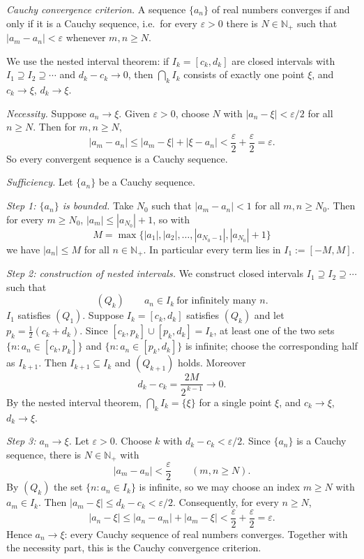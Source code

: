 \documentclass[11pt,a4paper]{article}
\newenvironment{solution}[1]{%
  \par\addvspace{1.7ex}%
  \noindent{\color{solutioncolor}\textbf{#1}}\hspace{0.55em}\ignorespaces}%
  {\par\addvspace{0.9ex}}
\begin{document}
\begin{solution}{Solution 2.3.19}\label{xs:2.3.19}
\emph{Cauchy convergence criterion.} A sequence $\{a_n\}$ of real numbers converges if and only if it is a Cauchy sequence, i.e.\ for every $\varepsilon > 0$ there is $N \in \mathbb{N}_+$ such that $|a_m - a_n| < \varepsilon$ whenever $m, n \ge N$.

We use the nested interval theorem: if $I_k = [c_k,d_k]$ are closed intervals with $I_1 \supseteq I_2 \supseteq \cdots$ and $d_k - c_k \to 0$, then $\bigcap_k I_k$ consists of exactly one point $\xi$, and $c_k \to \xi$, $d_k \to \xi$.

\medskip
\noindent\emph{Necessity.} Suppose $a_n \to \xi$. Given $\varepsilon > 0$, choose $N$ with $|a_n - \xi| < \varepsilon/2$ for all $n \ge N$. Then for $m, n \ge N$,
\[
|a_m - a_n| \le |a_m - \xi| + |\xi - a_n| < \frac{\varepsilon}{2} + \frac{\varepsilon}{2} = \varepsilon .
\]
So every convergent sequence is a Cauchy sequence.

\medskip
\noindent\emph{Sufficiency.} Let $\{a_n\}$ be a Cauchy sequence.

\emph{Step 1: $\{a_n\}$ is bounded.} Take $N_0$ such that $|a_m - a_n| < 1$ for all $m,n \ge N_0$. Then for every $m \ge N_0$, $|a_m| \le |a_{N_0}| + 1$, so with
\[
M = \max\{|a_1|, |a_2|, \dots, |a_{N_0-1}|, |a_{N_0}| + 1\}
\]
we have $|a_n| \le M$ for all $n \in \mathbb{N}_+$. In particular every term lies in $I_1 := [-M, M]$.

\emph{Step 2: construction of nested intervals.} We construct closed intervals $I_1 \supseteq I_2 \supseteq \cdots$ such that
\[
(Q_k) \qquad a_n \in I_k \ \text{for infinitely many } n .
\]
$I_1$ satisfies $(Q_1)$. Suppose $I_k = [c_k,d_k]$ satisfies $(Q_k)$ and let $p_k = \tfrac12(c_k+d_k)$. Since $[c_k,p_k] \cup [p_k,d_k] = I_k$, at least one of the two sets $\{n : a_n \in [c_k,p_k]\}$ and $\{n : a_n \in [p_k,d_k]\}$ is infinite; choose the corresponding half as $I_{k+1}$. Then $I_{k+1} \subseteq I_k$ and $(Q_{k+1})$ holds. Moreover
\[
d_k - c_k = \frac{2M}{2^{\,k-1}} \longrightarrow 0 .
\]
By the nested interval theorem, $\bigcap_k I_k = \{\xi\}$ for a single point $\xi$, and $c_k \to \xi$, $d_k \to \xi$.

\emph{Step 3: $a_n \to \xi$.} Let $\varepsilon > 0$. Choose $k$ with $d_k - c_k < \varepsilon/2$. Since $\{a_n\}$ is a Cauchy sequence, there is $N \in \mathbb{N}_+$ with
\[
|a_m - a_n| < \frac{\varepsilon}{2} \qquad (m, n \ge N).
\]
By $(Q_k)$ the set $\{n : a_n \in I_k\}$ is infinite, so we may choose an index $m \ge N$ with $a_m \in I_k$. Then $|a_m - \xi| \le d_k - c_k < \varepsilon/2$. Consequently, for every $n \ge N$,
\[
|a_n - \xi| \le |a_n - a_m| + |a_m - \xi| < \frac{\varepsilon}{2} + \frac{\varepsilon}{2} = \varepsilon .
\]
Hence $a_n \to \xi$: every Cauchy sequence of real numbers converges. Together with the necessity part, this is the Cauchy convergence criterion.
\end{solution}
\end{document}
